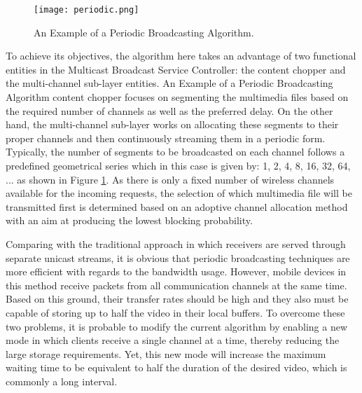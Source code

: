 \begin{figure}[!t]
\centering
\texttt{[image: periodic.png]}
\caption{An Example of a Periodic Broadcasting Algorithm.}
\label{periodic}
\end{figure}

To achieve its objectives, the algorithm here takes an advantage of two functional entities in the Multicast Broadcast Service Controller: the content chopper and the multi-channel sub-layer entities. An Example of a Periodic Broadcasting Algorithm content chopper focuses on segmenting the multimedia files based on the required number of channels as well as the preferred delay. On the other hand, the multi-channel sub-layer works on allocating these segments to their proper channels and then continuously streaming them in a periodic form. Typically, the number of segments to be broadcasted on each channel follows a predefined geometrical series which in this case is given by: {1, 2, 4, 8, 16, 32, 64, ... } as shown in Figure \ref{periodic}. As there is only a fixed number of wireless channels available for the incoming requests, the selection of which multimedia file will be transmitted first is determined based on an adoptive channel allocation method with an aim at producing the lowest blocking probability. 

Comparing with the traditional approach in which receivers are served through separate unicast streams, it is obvious that periodic broadcasting techniques are more efficient with regards to the bandwidth usage. However, mobile devices in this method receive packets from all communication channels at the same time. Based on this ground, their transfer rates should be high and they also must be capable of storing up to half the video in their local buffers. To overcome these two problems, it is probable to modify the current algorithm by enabling a new mode in which clients receive a single channel at a time, thereby reducing the large storage requirements. Yet, this new mode will increase the maximum waiting time to be equivalent to half the duration of the desired video, which is commonly a long interval.


